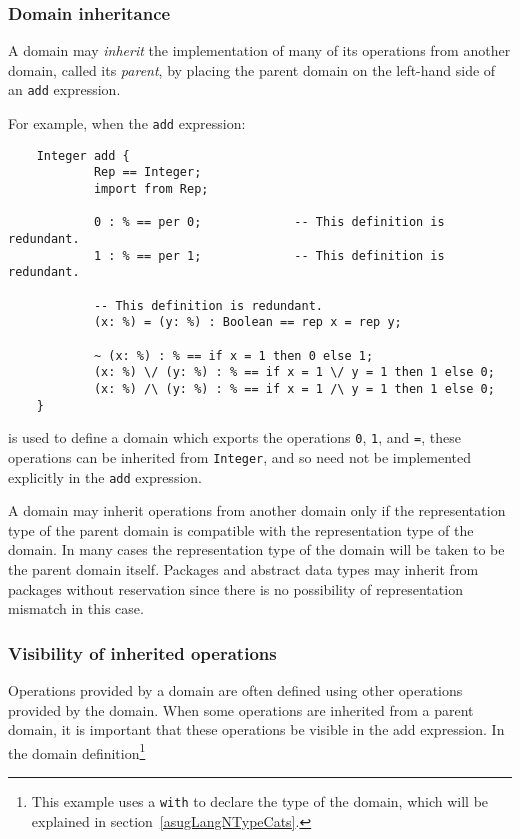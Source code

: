 {\subsubsection{Domain inheritance}

A domain may {\em inherit\/} the implementation
of many of its operations from another domain, called its {\em parent\/},
by placing the parent domain on the left-hand side of an \verb"add" expression.

For example, when the \verb"add" expression:

\begin{small}
\begin{verbatim}
    Integer add {
            Rep == Integer;
            import from Rep;

            0 : % == per 0;             -- This definition is redundant.
            1 : % == per 1;             -- This definition is redundant.

            -- This definition is redundant.
            (x: %) = (y: %) : Boolean == rep x = rep y;

            ~ (x: %) : % == if x = 1 then 0 else 1;
            (x: %) \/ (y: %) : % == if x = 1 \/ y = 1 then 1 else 0;
            (x: %) /\ (y: %) : % == if x = 1 /\ y = 1 then 1 else 0;
    }
\end{verbatim}
\end{small}

is used to define a domain which exports the operations \verb"0", \verb"1",
and \verb"=", these operations can be inherited from \verb"Integer", and
so need not be implemented explicitly in the \verb"add" expression.

A domain may inherit operations from another domain only if
the representation type of the parent domain is compatible
with the representation type of the domain.  In many cases the
representation type of the domain will be taken to be the parent domain
itself.  Packages and abstract data types may inherit from packages
without reservation since there is no possibility of representation
mismatch in this case.

\subsubsection{Visibility of inherited operations}

Operations provided by a domain are often defined using other operations
provided by the domain.  When some operations are inherited from a parent
domain, it is important that these operations be visible in the add
expression.  In the domain definition\footnote{This example uses a
{\tt with} to declare the type of the domain, which will be explained in
section~\ref{asugLangNTypeCats}.}

}
